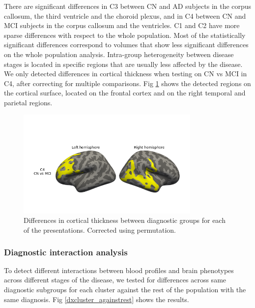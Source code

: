 There are significant differences in C3 between CN and AD subjects in the corpus callosum, the third ventricle and the choroid plexus, and in C4 between CN and MCI subjects in the corpus callosum and the ventricles. C1 and C2 have more sparse differences with respect to the whole population. Most of the statistically significant differences correspond to volumes that show less significant differences on the whole population analysis. Intra-group heterogeneity between disease stages is located in specific regions that are usually less affected by the disease. \\

We only detected differences in cortical thickness when testing on CN vs MCI in C4, after correcting for multiple comparisons. Fig \ref{dx_subgroups_cort} shows the detected regions on the cortical surface, located on the frontal cortex and on the right temporal and parietal regions. \\

\begin{figure}[!htbp]
\centering
\includegraphics[width=0.8\textwidth]{figures/cimlr/ex2_C4_CN_MCI.png}
\caption[Diagnostic group analysis, cortical thickness.]{Differences in cortical thickness between diagnostic groups for each of the presentations. Corrected using permutation.}
\label{dx_subgroups_cort}
\end{figure}

\subsubsection{Diagnostic interaction analysis}

To detect different interactions between blood profiles and brain phenotypes across different stages of the disease, we tested for differences across same diagnostic subgroups for each cluster against the rest of the population with the same diagnosis. Fig \ref{dxcluster_againstrest} shows the results.


